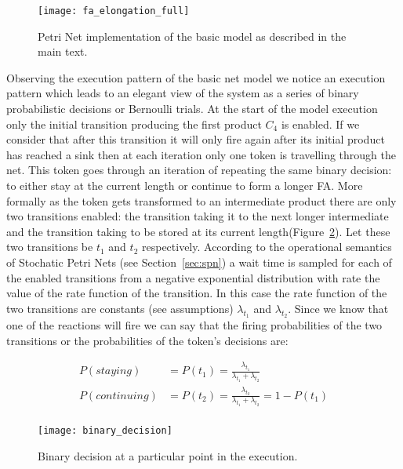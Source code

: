 \begin{figure}[htbp!]
\centering
\texttt{[image: fa\_elongation\_full]}
\caption[Petri Net implementation(basic model)]{Petri Net
  implementation of the basic model as described in the main text.}
\label{fig:fa_elongation_full}
\end{figure}


Observing the execution pattern of the basic net model we notice an
execution pattern which leads to an elegant view of the system as a
series of binary probabilistic decisions or Bernoulli trials. At the start of the model
execution only the initial transition producing the first product $C_4$ is
enabled. If we consider that after this transition it
will only fire again after its initial product has reached a sink then
at each iteration only one token is travelling through the net. This token
goes through an iteration of repeating the same binary decision: to either stay at the current length or continue to form a longer FA. More formally as the token gets
transformed to an intermediate product there are only two transitions
enabled: the transition taking it to the next longer intermediate and
the transition taking to be stored at its current length(Figure~\ref{fig:binary_decision}). Let these
two transitions be $t_1$ and $t_2$ respectively. According to
the operational semantics of Stochatic Petri Nets (see Section~\ref{sec:spn})
a wait time is sampled for each of the enabled transitions from a
negative exponential distribution with rate the value of the rate
function of the
transition. In this case the rate function of the two transitions are
constants (see assumptions) $\lambda_{t_1}$ and $\lambda_{t_2}$. Since
we know that one of the reactions will fire we can say that the
firing probabilities of the two transitions or the probabilities of
the token's decisions are:

\begin{align*}
P(staying)& =P(t_1) = \frac{\lambda_{t_1}}{\lambda_{t_1} + \lambda_{t_2}}\\
P(continuing) & = P(t_2) = \frac{\lambda_{t_2}}{\lambda_{t_1} + \lambda_{t_2}} = 1 - P(t_1)\\
\end{align*}


\begin{figure}[htbp!]
\centering
\texttt{[image: binary\_decision]}
\caption[Binary stay-continue decision]{Binary decision at a
  particular point in the execution.}
\label{fig:binary_decision}
\end{figure}

